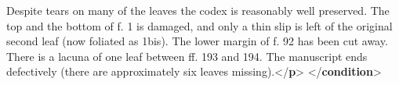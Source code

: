 \begin{shaded}
Despite tears on many of the leaves the codex is reasonably well\mbox{}\newline 
\hspace*{1em}\hspace*{1em} preserved. The top and the bottom of f. 1 is damaged, and only a thin slip is\mbox{}\newline 
\hspace*{1em}\hspace*{1em} left of the original second leaf (now foliated as 1bis). The lower margin of f.\mbox{}\newline 
\hspace*{1em}\hspace*{1em} 92 has been cut away. There is a lacuna of one leaf between ff. 193 and 194. The\mbox{}\newline 
\hspace*{1em}\hspace*{1em} manuscript ends defectively (there are approximately six leaves\mbox{}\newline 
\hspace*{1em}\hspace*{1em} missing).{</\textbf{p}>}\mbox{}\newline 
{</\textbf{condition}>}\end{shaded}\egroup\par 
